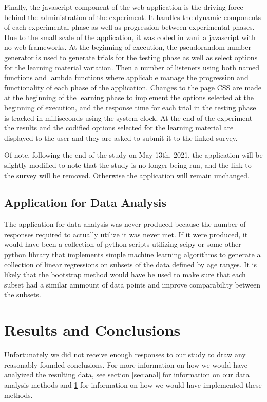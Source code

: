 \documentclass[12pt]{report}
\begin{document}
Finally, the javascript component of the web application is the driving force behind the administration of the experiment. It handles the dynamic components of each experimental phase as well as progression between experimental phases. Due to the small scale of the application, it was coded in vanilla javascript with no web-frameworks. At the beginning of execution, the pseudorandom number generator is used to generate trials for the testing phase as well as select options for the learning material variation. Then a number of listeners using both named functions and lambda functions where applicable manage the progression and functionality of each phase of the application. Changes to the page CSS are made at the beginning of the learning phase to implement the options selected at the beginning of execution, and the response time for each trial in the testing phase is tracked in milliseconds using the system clock. At the end of the experiment the results and the codified options selected for the learning material are displayed to the user and they are asked to submit it to the linked survey.

Of note, following the end of the study on May 13th, 2021, the application will be slightly modified to note that the study is no longer being run, and the link to the survey will be removed. Otherwise the application will remain unchanged.

\section{Application for Data Analysis}
\label{sec:app anal}

The application for data analysis was never produced because the number of responses required to actually utilize it was never met. If it were produced, it would have been a collection of python scripts utilizing scipy or some other python library that implements simple machine learning algorithms to generate a collection of linear regressions on subsets of the data defined by age ranges. It is likely that the bootstrap method would have be used to make sure that each subset had a similar ammount of data points and improve comparability between the subsets.

\chapter{Results and Conclusions}

Unfortunately we did not receive enough responses to our study to draw any reasonably founded conclusions. For more information on how we would have analyized the resulting data, see section \ref{sec:anal} for information on our data analysis methods and \ref{sec:app anal} for information on how we would have implemented these methods.
\end{document}
